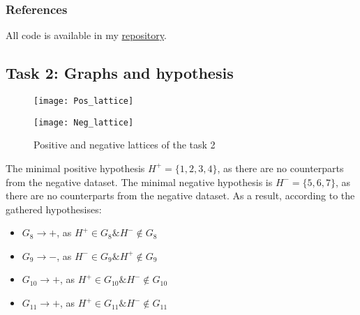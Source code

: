 \subsubsection{References}

All code is available in my \href{https://github.com/Chpel/Maga/blob/main/OSDA\%20.ipynb/Untitled.ipynb}{repository}.

\subsection{Task 2: Graphs and hypothesis}

\begin{figure}[h]
\centering
\begin{minipage}{0.49\textwidth}
\texttt{[image: Pos\_lattice]}
\end{minipage}
\hfill
\begin{minipage}{0.49\textwidth}
\texttt{[image: Neg\_lattice]}
\end{minipage}
\caption{Positive and negative lattices of the task 2}
\end{figure}

The minimal positive hypothesis $H^{+}=\{1,2,3,4\}$, as there are no counterparts from the negative dataset.
The minimal negative hypothesis is $H^{-}=\{5,6,7\}$, as there are no counterparts from the negative dataset.
As a result, according to the gathered hypothesises:

\begin{itemize}
\item $G_8 \rightarrow +$, as $H^{+} \in G_8 \& H^{-} \notin G_8$
\item $G_9 \rightarrow -$, as $H^{-} \in G_9 \& H^{+} \notin G_9$
\item $G_{10} \rightarrow +$, as $H^{+} \in G_{10} \& H^{-} \notin G_{10}$
\item $G_{11} \rightarrow +$, as $H^{+} \in G_{11} \& H^{-} \notin G_{11}$
\end{itemize}
